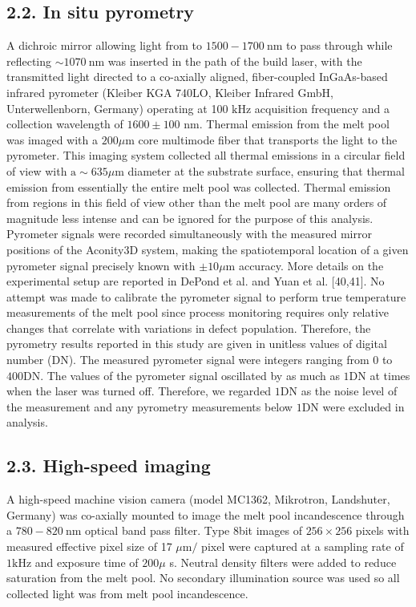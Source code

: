 \documentclass[10pt]{article}
\begin{document}
\subsection*{2.2. In situ pyrometry}
A dichroic mirror allowing light from to $1500-1700 \mathrm{~nm}$ to pass through while reflecting $\sim 1070 \mathrm{~nm}$ was inserted in the path of the build laser, with the transmitted light directed to a co-axially aligned, fiber-coupled InGaAs-based infrared pyrometer (Kleiber KGA 740LO, Kleiber Infrared GmbH, Unterwellenborn, Germany) operating at 100 $\mathrm{kHz}$ acquisition frequency and a collection wavelength of $1600 \pm 100$ $\mathrm{nm}$. Thermal emission from the melt pool was imaged with a $200 \mu \mathrm{m}$ core multimode fiber that transports the light to the pyrometer. This imaging system collected all thermal emissions in a circular field of view with $\mathrm{a} \sim 635 \mu \mathrm{m}$ diameter at the substrate surface, ensuring that thermal emission from essentially the entire melt pool was collected. Thermal emission from regions in this field of view other than the melt pool are many orders of magnitude less intense and can be ignored for the purpose of this analysis. Pyrometer signals were recorded simultaneously with the measured mirror positions of the Aconity3D system, making the spatiotemporal location of a given pyrometer signal precisely known with $\pm 10 \mu \mathrm{m}$ accuracy. More details on the experimental setup are reported in DePond et al. and Yuan et al. [40,41]. No attempt was made to calibrate the pyrometer signal to perform true temperature measurements of the melt pool since process monitoring requires only relative changes that correlate with variations in defect population. Therefore, the pyrometry results reported in this study are given in unitless values of digital number (DN). The measured pyrometer signal were integers ranging from 0 to $400 \mathrm{DN}$. The values of the pyrometer signal oscillated by as much as $1 \mathrm{DN}$ at times when the laser was turned off. Therefore, we regarded $1 \mathrm{DN}$ as the noise level of the measurement and any pyrometry measurements below $1 \mathrm{DN}$ were excluded in analysis.

\subsection*{2.3. High-speed imaging}
A high-speed machine vision camera (model MC1362, Mikrotron, Landshuter, Germany) was co-axially mounted to image the melt pool incandescence through a $780-820 \mathrm{~nm}$ optical band pass filter. Type 8bit images of $256 \times 256$ pixels with measured effective pixel size of 17 $\mu \mathrm{m} /$ pixel were captured at a sampling rate of $1 \mathrm{kHz}$ and exposure time of $200 \mu$ s. Neutral density filters were added to reduce saturation from the melt pool. No secondary illumination source was used so all collected light was from melt pool incandescence.
\end{document}
